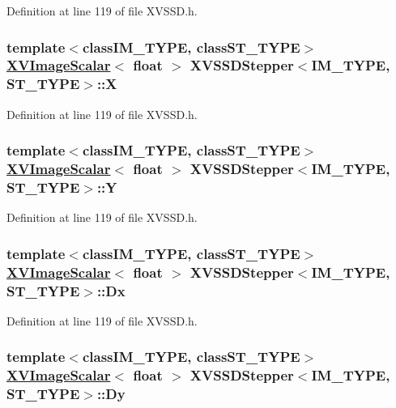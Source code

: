 Definition at line 119 of file XVSSD.h.\label{XVSSDStepper_n1}
\hypertarget{class_XVSSDStepper_n1}{
\subsubsection[X]{\setlength{\rightskip}{0pt plus 5cm}template$<$classIM\_\-TYPE, classST\_\-TYPE$>$ \hyperlink{class_XVImageScalar}{XVImage\-Scalar}$<$ float $>$ XVSSDStepper$<$IM\_\-TYPE, ST\_\-TYPE$>$::X}}




Definition at line 119 of file XVSSD.h.\label{XVSSDStepper_n2}
\hypertarget{class_XVSSDStepper_n2}{
\subsubsection[Y]{\setlength{\rightskip}{0pt plus 5cm}template$<$classIM\_\-TYPE, classST\_\-TYPE$>$ \hyperlink{class_XVImageScalar}{XVImage\-Scalar}$<$ float $>$ XVSSDStepper$<$IM\_\-TYPE, ST\_\-TYPE$>$::Y}}




Definition at line 119 of file XVSSD.h.\label{XVSSDStepper_n3}
\hypertarget{class_XVSSDStepper_n3}{
\subsubsection[Dx]{\setlength{\rightskip}{0pt plus 5cm}template$<$classIM\_\-TYPE, classST\_\-TYPE$>$ \hyperlink{class_XVImageScalar}{XVImage\-Scalar}$<$ float $>$ XVSSDStepper$<$IM\_\-TYPE, ST\_\-TYPE$>$::Dx}}




Definition at line 119 of file XVSSD.h.\label{XVSSDStepper_n4}
\hypertarget{class_XVSSDStepper_n4}{
\subsubsection[Dy]{\setlength{\rightskip}{0pt plus 5cm}template$<$classIM\_\-TYPE, classST\_\-TYPE$>$ \hyperlink{class_XVImageScalar}{XVImage\-Scalar}$<$ float $>$ XVSSDStepper$<$IM\_\-TYPE, ST\_\-TYPE$>$::Dy}}




